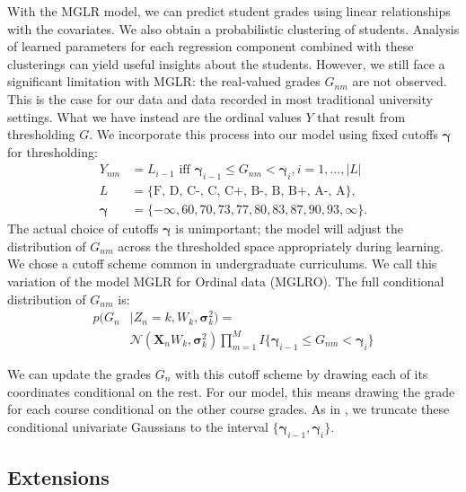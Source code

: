 \documentclass[10pt]{proc}
\begin{document}
With the MGLR model, we can predict student grades using linear relationships
with the covariates. We also obtain a probabilistic clustering of students.
Analysis of learned parameters for each regression component combined with
these clusterings can yield useful insights about the students. However, we
still face a significant limitation with MGLR: the real-valued grades $G_{nm}$
are not observed. This is the case for our data and data recorded in most
traditional university settings. What we have instead are the ordinal values
$Y$ that result from thresholding $G$. We incorporate this process into our
model using fixed cutoffs $\bm{\gamma}$ for thresholding:
%
\begin{align}
    Y_{nm} &= L_{i-1} \text{ iff } \bm{\gamma}_{i-1} \le G_{nm} < \bm{\gamma}_{i},
            i = 1, ..., |L|  \\
         L &= \{\text{F, D, C-, C, C+, B-, B, B+, A-, A} \},  \\
    \bm{\gamma} &= \{ {-}\infty, 60, 70, 73, 77, 80, 83, 87, 90, 93, \infty \}.
\end{align}
%
The actual choice of cutoffs $\bm{\gamma}$ is unimportant; the model will adjust
the distribution of $G_{nm}$ across the thresholded space appropriately during
learning. We chose a cutoff scheme common in undergraduate curriculums.
We call this variation of the model MGLR for Ordinal data (MGLRO). The
full conditional distribution of $G_{nm}$ is:
%
\begin{align}
    p(G_n &| Z_n = k, W_k, \bm{\sigma}_k^2) =  \\
        &\mathcal{N}(\bm{X}_n W_k, \bm{\sigma}_k^2)
        \prod_{m=1}^M I\{\bm{\gamma}_{i-1} \le G_{nm} < \bm{\gamma}_{i}\}
\end{align}

We can update the grades $G_n$ with this cutoff scheme by drawing each of its
coordinates conditional on the rest. For our model, this means drawing the
grade for each course conditional on the other course grades. As in
\cite{kottas_nonparametric_2005}, we truncate these conditional univariate
Gaussians to the interval $\{\bm{\gamma}_{i-1}, \bm{\gamma}_i\}$.

\subsection{Extensions}
\end{document}
